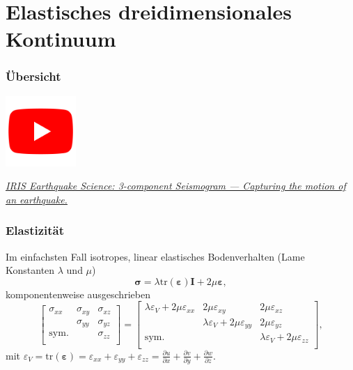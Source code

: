 \documentclass[hyperref={pdfpagemode=FullScreen, colorlinks=false}]{beamer}
\begin{document}
\maketitle

\section{Elastisches dreidimensionales Kontinuum}

\begin{frame}
\frametitle{Übersicht}
\begin{center}
\includegraphics[width=0.2\textwidth]{fig_img/youtube.png}   
\end{center}

\href{https://www.youtube.com/watch?v=Za_22xo7ZQQ}{\textsl{IRIS Earthquake Science: 3-component Seismogram --- Capturing the motion of an earthquake.}}

\end{frame}

\begin{frame}
\frametitle{Elastizität}
Im einfachsten Fall isotropes, linear elastisches Bodenverhalten
(Lame Konstanten $\lambda$ und $\mu$)
\begin{equation*}
 \boldsymbol{\sigma} = \lambda \mathrm{tr}(\boldsymbol{\varepsilon})\mathbf{I} + 2\mu \boldsymbol{\varepsilon},
\end{equation*}
komponentenweise ausgeschrieben
\begin{equation*}
\left[\begin{array}{ccc}
        \sigma_{xx} & \sigma_{xy} & \sigma_{xz} \\
         & \sigma_{yy} & \sigma_{yz} \\
        \mathrm{sym.} &  & \sigma_{zz} \\
\end{array}\right]
=
\left[\begin{array}{ccc}
        \lambda\varepsilon_V+2\mu\varepsilon_{xx} & 2\mu\varepsilon_{xy} & 2\mu\varepsilon_{xz} \\
         & \lambda\varepsilon_V+ 2\mu\varepsilon_{yy} & 2\mu\varepsilon_{yz} \\
        \mathrm{sym.} &  & \lambda\varepsilon_V+ 2\mu\varepsilon_{zz} \\
\end{array}\right],
\end{equation*}
mit $\varepsilon_V=\mathrm{tr}(\boldsymbol{\varepsilon})=\varepsilon_{xx}+\varepsilon_{yy}+\varepsilon_{zz}=\frac{\partial u}{\partial x}+\frac{\partial v}{\partial y}+\frac{\partial w}{\partial z}$.
\end{frame}
\end{document}
